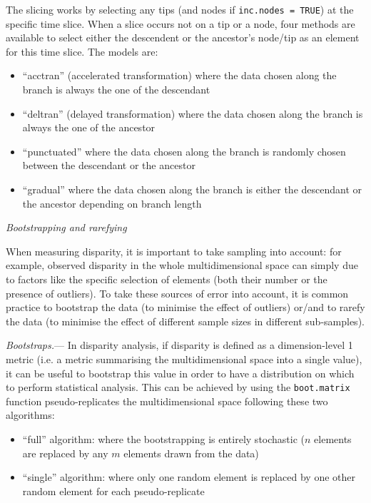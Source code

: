 \documentclass[12pt,letterpaper]{article}
\renewcommand{\subsection}[1]{%
\bigskip
\begin{center}
\begin{large}
\normalfont\itshape #1
\end{large}
\end{center}}
\renewcommand{\subsubsection}[1]{%
\vspace{2ex}
\noindent
\textit{#1.}---}
\begin{document}
The slicing works by selecting any tips (and nodes if \texttt{inc.nodes = TRUE}) at the specific time slice.
When a slice occurs not on a tip or a node, four methods are available to select either the descendent or the ancestor's node/tip as an element for this time slice.
The models are:
\begin{itemize}
    \item ``acctran'' (accelerated transformation) where the data chosen along the branch is always the one of the descendant
    \item ``deltran'' (delayed transformation) where the data chosen along the branch is always the one of the ancestor
    \item ``punctuated'' where the data chosen along the branch is randomly chosen between the descendant or the ancestor
    \item ``gradual'' where the data chosen along the branch is either the descendant or the ancestor depending on branch length
\end{itemize}

\subsection{Bootstrapping and rarefying}
When measuring disparity, it is important to take sampling into account: for example, observed disparity in the whole multidimensional space can simply due to factors like the specific selection of elements (both their number or the presence of outliers).
To take these sources of error into account, it is common practice to bootstrap the data (to minimise the effect of outliers) or/and to rarefy the data (to minimise the effect of different sample sizes in different sub-samples).

\subsubsection{Bootstraps}
In disparity analysis, if disparity is defined as a dimension-level 1 metric (i.e. a metric summarising the multidimensional space into a single value), it can be useful to bootstrap this value in order to have a distribution on which to perform statistical analysis.
This can be achieved by using the \texttt{boot.matrix} function pseudo-replicates the multidimensional space following these two algorithms:

\begin{itemize}
    \item ``full'' algorithm: where the bootstrapping is entirely stochastic ($n$ elements are replaced by any $m$ elements drawn from the data)
    \item ``single'' algorithm: where only one random element is replaced by one other random element for each pseudo-replicate
\end{itemize}
\end{document}
